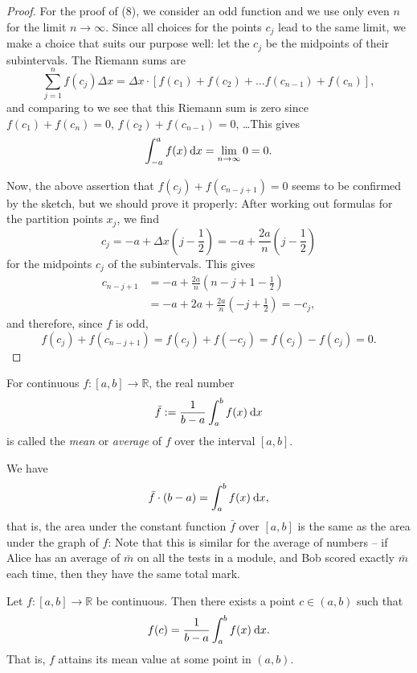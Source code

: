 \begin{proof}
For the proof of (8), we consider an odd function and we use only even $n$ for the limit $n\to\infty$. Since all choices for the points $c_j$ lead to the same limit, we make a choice that suits our purpose well: let the $c_j$ be the midpoints of their subintervals. The Riemann sums are
\[ \sum_{j=1}^n f(c_j) \Delta x 
= \Delta x \cdot \left[ f(c_1) + f(c_2) + \dots f(c_{n-1}) + f(c_n) \right], \]
and comparing to 
we see that this Riemann sum is zero since $f(c_1)+f(c_n)=0$, $f(c_2)+f(c_{n-1})=0$, \ldots This gives 
\[ \int_{-a}^{a} f(x) \: \mathrm{d} x = \lim_{n \to \infty} 0 = 0.\]

Now, the above assertion that $f(c_{j})+f(c_{n-j+1})=0$ seems to be confirmed by the sketch, but we should prove it properly: After working out formulas for the partition points $x_j$, we find
\[ c_j = -a+\Delta x\left(j-\frac12\right) = -a+\frac{2a}{n}\left(j-\frac12\right) \]
for the midpoints $c_j$ of the subintervals. This gives
\begin{equation*}
\begin{split}
c_{n-j+1} & = -a+\frac{2a}{n}\left(n-j+1-\frac12\right) \\
& = -a+2a+\frac{2a}{n}\left(-j+\frac12\right) = -c_j,
\end{split}
\end{equation*}
and therefore, since $f$ is odd,
\[ f(c_j)+f(c_{n-j+1})=f(c_j)+f(-c_j)=f(c_j)-f(c_j) = 0. \]
\end{proof}

\begin{definition}[Mean]
For continuous $f:[a,b]\rightarrow\mathbb{R}$, the real number
\[ \bar{f}:= \frac{1}{b-a} \int_{a}^{b} f(x) \: \mathrm{d} x \]
is called the \emph{mean} or \emph{average} of $f$ over the interval $[a,b]$.
\end{definition}

\begin{remark}
We have
\[ \bar{f}\cdot(b-a) = \int_{a}^{b} f(x) \: \mathrm{d} x, \]
that is, the area under the constant function $\bar{f}$ over $[a,b]$ is the same as the area under the graph of $f$:
Note that this is similar for the average of numbers -- if Alice has an average of $\bar{m}$ on all the tests in a module, and Bob scored exactly $\bar{m}$ each time, then they have the same total mark.
\end{remark}

\begin{theorem}
Let $f:[a,b]\rightarrow\mathbb{R}$ be continuous. Then there exists a point $c\in(a,b)$ such that
\[ f(c) = \frac{1}{b-a} \int_{a}^{b} f(x) \: \mathrm{d} x. \]
That is, $f$ attains its mean value at some point in $(a,b)$.
\end{theorem}

